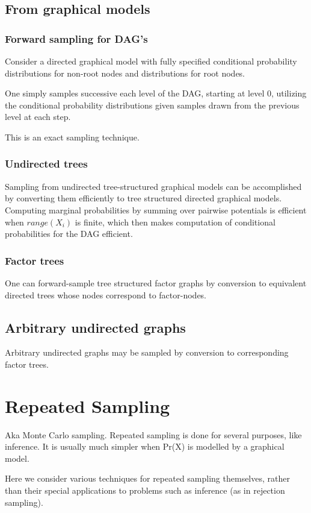 \documentclass[oneside, article]{memoir}
\begin{document}
\subsection{From graphical models}
\subsubsection{Forward sampling for DAG's}
Consider a directed graphical model with fully specified conditional probability distributions for non-root nodes and distributions for root nodes.

One simply samples successive each level of the DAG, starting at level 0, utilizing the conditional probability distributions given samples drawn from the previous level at each step.

This is an exact sampling technique.

\subsubsection{Undirected trees}
Sampling from undirected tree-structured graphical models can be accomplished by converting them efficiently to tree structured directed graphical models. Computing marginal probabilities by summing over pairwise potentials  is efficient when $range(X_i)$ is finite, which then makes computation of conditional probabilities for the DAG efficient.

\subsubsection{Factor trees}
One can forward-sample tree structured factor graphs by conversion to equivalent directed trees whose nodes correspond to factor-nodes.

\subsection{Arbitrary undirected graphs}
Arbitrary undirected graphs may be sampled by conversion to corresponding factor trees.

\section{Repeated Sampling}
Aka Monte Carlo sampling. Repeated sampling is done for several purposes, like inference. It is usually much simpler when Pr(X) is modelled by a graphical model.

Here we consider various techniques for repeated sampling themselves, rather than their special applications to problems such as inference (as in rejection sampling).
\end{document}
